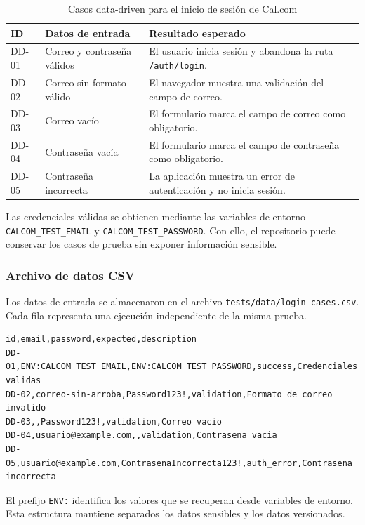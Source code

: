 \documentclass{article}
\begin{document}
\begin{table}[H]
\centering
\small
\caption{Casos data-driven para el inicio de sesión de Cal.com}
\label{tab:data-driven-login}
\begin{tabularx}{\textwidth}{|>{\centering\arraybackslash}p{1.4cm}|X|X|}
\hline
\textbf{ID} & \textbf{Datos de entrada} & \textbf{Resultado esperado} \\
\hline
DD-01 & Correo y contraseña válidos & El usuario inicia sesión y abandona la ruta \texttt{/auth/login}. \\
\hline
DD-02 & Correo sin formato válido & El navegador muestra una validación del campo de correo. \\
\hline
DD-03 & Correo vacío & El formulario marca el campo de correo como obligatorio. \\
\hline
DD-04 & Contraseña vacía & El formulario marca el campo de contraseña como obligatorio. \\
\hline
DD-05 & Contraseña incorrecta & La aplicación muestra un error de autenticación y no inicia sesión. \\
\hline
\end{tabularx}
\end{table}

Las credenciales válidas se obtienen mediante las variables de entorno \texttt{CALCOM\_TEST\_EMAIL} y \texttt{CALCOM\_TEST\_PASSWORD}. Con ello, el repositorio puede conservar los casos de prueba sin exponer información sensible.

\subsubsection{Archivo de datos CSV}

Los datos de entrada se almacenaron en el archivo \texttt{tests/data/login\_cases.csv}. Cada fila representa una ejecución independiente de la misma prueba.

\begin{lstlisting}[caption={Archivo CSV con los casos de prueba data-driven}]
id,email,password,expected,description
DD-01,ENV:CALCOM_TEST_EMAIL,ENV:CALCOM_TEST_PASSWORD,success,Credenciales validas
DD-02,correo-sin-arroba,Password123!,validation,Formato de correo invalido
DD-03,,Password123!,validation,Correo vacio
DD-04,usuario@example.com,,validation,Contrasena vacia
DD-05,usuario@example.com,ContrasenaIncorrecta123!,auth_error,Contrasena incorrecta
\end{lstlisting}

El prefijo \texttt{ENV:} identifica los valores que se recuperan desde variables de entorno. Esta estructura mantiene separados los datos sensibles y los datos versionados.
\end{document}
